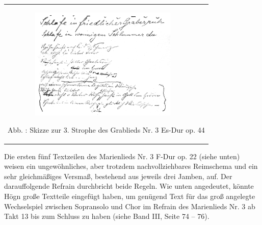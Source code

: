 \documentclass[a4paper]{article}
\newcounter{Abb}
\renewcommand\theAbb{\arabic{Abb}}
\begin{document}
\begin{center}
\begin{minipage}{10.264cm}
\begin{flushleft}
\tablefirsthead{}
\tablehead{}
\tabletail{}
\tablelasttail{}
\begin{supertabular}{m{10.064cm}}

\includegraphics[width=9.881cm,height=5.323cm]{pictures/zulassungsarbeit-img071.png}

Abb. \stepcounter{Abb}{\theAbb}: Skizze zur 3. Strophe des Grablieds Nr.
3 Es-Dur op. 44\\
\end{supertabular}
\end{flushleft}
\end{minipage}
\end{center}
Die ersten fünf Textzeilen des Marienlieds Nr. 3 F-Dur op. 22 (siehe
unten) weisen ein ungewöhnliches, aber trotzdem nachvollziehbares
Reimschema und ein sehr gleichmäßiges Versmaß, bestehend aus jeweils
drei Jamben, auf. Der darauffolgende Refrain durchbricht beide Regeln.
Wie unten angedeutet, könnte Högn große Textteile eingefügt haben, um
genügend Text für das groß angelegte Wechselspiel zwischen Sopransolo
und Chor im Refrain des Marienlieds Nr. 3 ab Takt 13 bis zum Schluss zu
haben (siehe Band III, Seite 74 – 76).
\end{document}
